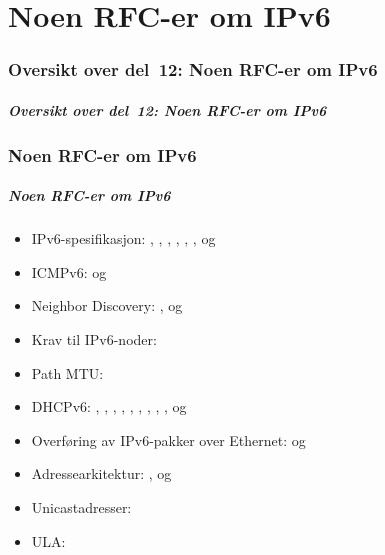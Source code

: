 \part{Noen RFC-er om IPv6}

\begin{frame}
  \partpage
\end{frame}

\section*{Oversikt over del~12: Noen RFC-er om IPv6}
\begin{frame}[allowframebreaks]
  \frametitle{Oversikt over del~12: Noen RFC-er om IPv6}
    \tableofcontents%
\end{frame}

\section{Noen RFC-er om IPv6}
\begin{frame}%
  \frametitle{Noen RFC-er om IPv6}
  \begin{itemize}%
  \item IPv6-spesifikasjon: , , ,
    , , ,  og 
  \item ICMPv6:  og 
  \item Neighbor Discovery: ,  og 
  \item Krav til IPv6-noder: 
  \item Path MTU: 
  \item DHCPv6: , , , ,
    , , , , ,
     og 
  \item Overføring av IPv6-pakker over Ethernet:  og
  \item Adressearkitektur: ,  og 
  \item Unicastadresser: 
  \item ULA: 
  \end{itemize}
\end{frame}

